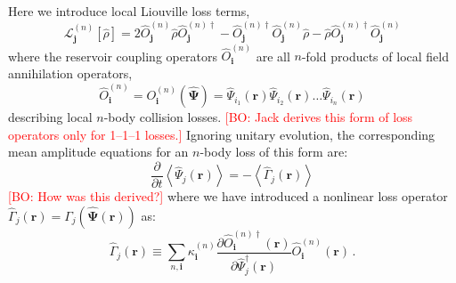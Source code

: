 \documentclass[aps,prl,twocolumn,showpacs,amsmath,amssymb,superscriptaddress]{revtex4-1}
\newcommand{\bogdansremark}[1]{\textcolor{red}{{[}BO: #1{]}}}
\begin{document}
Here we introduce local Liouville loss terms,
\begin{equation}
	\mathcal{L}_{\mathbf{j}}^{(n)} \left[ \hat{\rho}\right] =
	2 \hat{O}_{\mathbf{j}}^{(n)} \hat{\rho}\hat{O}_{\mathbf{j}}^{(n)\dagger} -
	\hat{O}_{\mathbf{j}}^{(n)\dagger}\hat{O}_{\mathbf{j}}^{(n)}\hat{\rho} -
	\hat{\rho}\hat{O}_{\mathbf{j}}^{(n)\dagger}\hat{O}_{\mathbf{j}}^{(n)}
\end{equation}
where the reservoir coupling operators $\hat{O}_{\mathbf{i}}^{(n)}$
are all $n$-fold products of local field annihilation operators,
\begin{equation}
	\hat{O}_{\mathbf{i}}^{(n)} =
	O_{\mathbf{i}}^{(n)} \left( \widehat{\boldsymbol{\Psi}} \right) =
	\widehat{\Psi}_{i_{1}} \left( \mathbf{r} \right)
	\widehat{\Psi}_{i_{2}} \left( \mathbf{r} \right) \ldots
	\widehat{\Psi}_{i_{n}} \left( \mathbf{r} \right)
\end{equation}
describing local $n$-body collision losses.
	\bogdansremark{Jack derives this form of loss operators only for 1--1--1 losses.}
Ignoring unitary evolution, the corresponding mean amplitude equations
for an $n$-body loss of this form are:
\begin{equation}
	\frac{\partial}{\partial t} \left\langle
		\widehat{\Psi}_{j} \left( \mathbf{r} \right)
	\right\rangle =
	-\left\langle \hat{\Gamma}_{j} \left( \mathbf{r} \right) \right\rangle
\end{equation}
	\bogdansremark{How was this derived?}
where we have introduced a nonlinear loss operator $\hat{\Gamma}_{j} \left( \mathbf{r} \right) =
\Gamma_{j} \left( \widehat{\boldsymbol{\Psi}} \left( \mathbf{r} \right) \right)$
as:
\begin{equation}
	\hat{\Gamma}_{j} \left( \mathbf{r} \right) \equiv
	\sum_{n,\mathbf{i}} \kappa_{\mathbf{i}}^{(n)}
	\frac{\partial\hat{O}_{\mathbf{i}}^{(n)\dagger}	\left( \mathbf{r} \right)}
		{\partial \hat{\Psi}_{j}^{\dagger} \left( \mathbf{r} \right)}
	\hat{O}_{\mathbf{i}}^{(n)} \left( \mathbf{r} \right) \,.
\end{equation}
\end{document}
